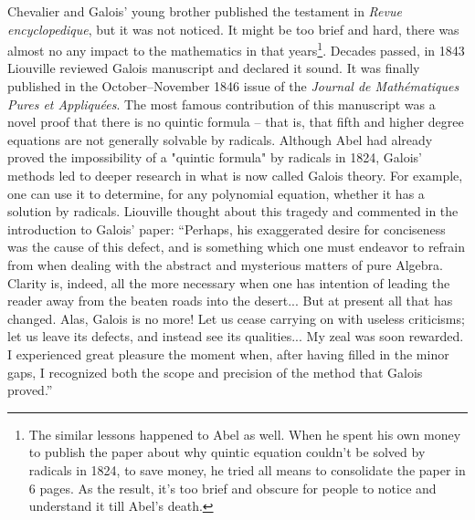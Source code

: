 \documentclass[b5paper]{article}
\begin{document}
Chevalier and Galois' young brother published the testament in {\em Revue encyclopedique}, but it was not noticed. It might be too brief and hard, there was almost no any impact to the mathematics in that years\footnote{The similar lessons happened to Abel as well. When he spent his own money to publish the paper about why quintic equation couldn't be solved by radicals in 1824, to save money, he tried all means to consolidate the paper in 6 pages. As the result, it's too brief and obscure for people to notice and understand it till Abel's death.}. Decades passed, in 1843 Liouville reviewed Galois manuscript and declared it sound. It was finally published in the October–November 1846 issue of the {\em Journal de Mathématiques Pures et Appliquées}. The most famous contribution of this manuscript was a novel proof that there is no quintic formula – that is, that fifth and higher degree equations are not generally solvable by radicals. Although Abel had already proved the impossibility of a "quintic formula" by radicals in 1824, Galois' methods led to deeper research in what is now called Galois theory. For example, one can use it to determine, for any polynomial equation, whether it has a solution by radicals. Liouville thought about this tragedy and commented in the introduction to Galois' paper: ``Perhaps, his exaggerated desire for conciseness was the cause of this defect, and is something which one must endeavor to refrain from when dealing with the abstract and mysterious matters of pure Algebra. Clarity is, indeed, all the more necessary when one has intention of leading the reader away from the beaten roads into the desert... But at present all that has changed. Alas, Galois is no more! Let us cease carrying on with useless criticisms; let us leave its defects, and instead see its qualities... My zeal was soon rewarded. I experienced great pleasure the moment when, after having filled in the minor gaps, I recognized both the scope and precision of the method that Galois proved.''\cite{Liouville-1846}
\end{document}
